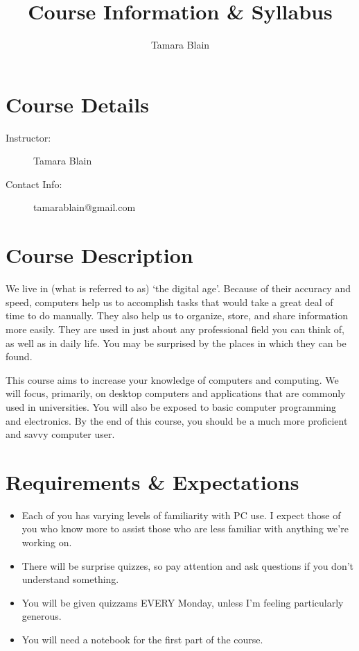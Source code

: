 \documentclass[11pt]{article}
\begin{document}
\title{Course Information \& Syllabus}
\author{Tamara Blain}
\date{}
\maketitle
\thispagestyle{fancy}


\section{Course Details}
\begin{description}
\item[Instructor:] Tamara Blain
\item[Contact Info:]  tamarablain@gmail.com
\end{description}


\section{Course Description}
We live in (what is referred to as) `the digital age'.  Because of their accuracy and speed, computers help us to accomplish tasks that would take a great deal of time to do manually.  They also help us to organize, store, and share information more easily.  They are used in just about any professional field you can think of, as well as in daily life.  You may be surprised by the places in which they can be found.

This course aims to increase your knowledge of computers and computing.  We will focus, primarily, on desktop computers and applications that are commonly used in universities.  You will also be exposed to basic computer programming and electronics.  By the end of this course, you should be a much more proficient and savvy computer user.


\section{Requirements \& Expectations}

\begin{itemize}
\item Each of you has varying levels of familiarity with PC use.  I expect those of you who know more to assist those who are less familiar with anything we're working on.
\item There will be surprise quizzes, so pay attention and ask questions if you don't understand something.
\item You will be given quizzams EVERY Monday, unless I'm feeling particularly generous.
\item You will need a notebook for the first part of the course.
\end{itemize}
\end{document}
